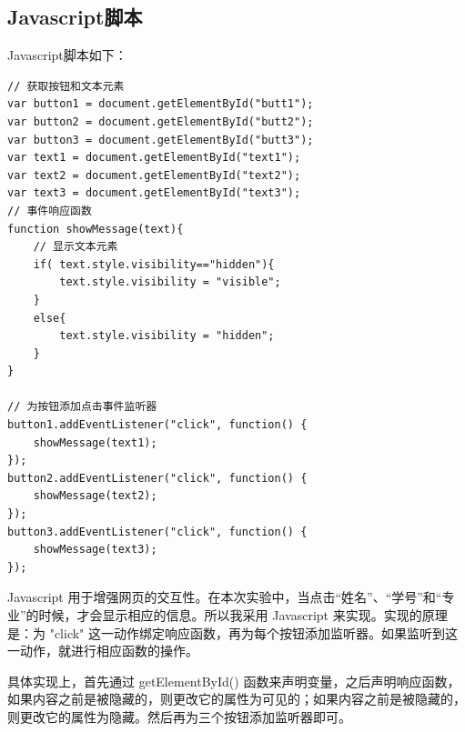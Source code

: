 \documentclass[UTF8,a4paper,10pt]{ctexart}
\begin{document}
\subsection{Javascript脚本}
Javascript脚本如下：
\begin{lstlisting}[frame=trbl]
// 获取按钮和文本元素
var button1 = document.getElementById("butt1");
var button2 = document.getElementById("butt2");
var button3 = document.getElementById("butt3");
var text1 = document.getElementById("text1");
var text2 = document.getElementById("text2");
var text3 = document.getElementById("text3");
// 事件响应函数
function showMessage(text){
    // 显示文本元素
    if( text.style.visibility=="hidden"){
        text.style.visibility = "visible";
    }
    else{
        text.style.visibility = "hidden";
    }
}

// 为按钮添加点击事件监听器
button1.addEventListener("click", function() {
    showMessage(text1);
});
button2.addEventListener("click", function() {
    showMessage(text2);
});
button3.addEventListener("click", function() {
    showMessage(text3);
});
\end{lstlisting}
Javascript 用于增强网页的交互性。在本次实验中，当点击“姓名”、“学号”和“专业”的时候，才会显示相应的信息。所以我采用 Javascript 来实现。实现的原理是：为 "click" 这一动作绑定响应函数，再为每个按钮添加监听器。如果监听到这一动作，就进行相应函数的操作。\par
具体实现上，首先通过 getElementById() 函数来声明变量，之后声明响应函数，如果内容之前是被隐藏的，则更改它的属性为可见的；如果内容之前是被隐藏的，则更改它的属性为隐藏。然后再为三个按钮添加监听器即可。
\end{document}
